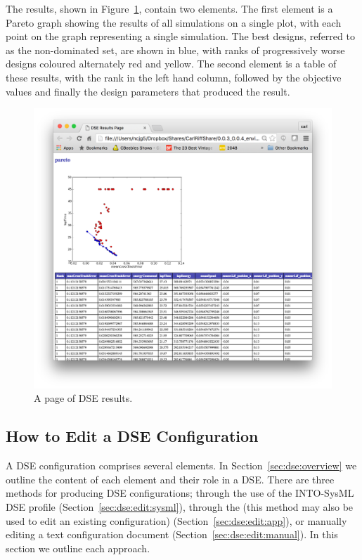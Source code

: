 The results, shown in Figure~\ref{fig:dse:results:page}, contain two elements.  The first element is a Pareto graph showing the results of all simulations on a single plot, with each point on the graph representing a single simulation.  The best designs, referred to as the non-dominated set, are shown in blue, with ranks of progressively worse designs coloured alternately red and yellow.  The second element is a table of these results, with the rank in the left hand column, followed by the objective values and finally the design parameters that produced the result.
%
%
%
\begin{figure}[ht]
	\centering
	\includegraphics[width=\textwidth]{figures/dse/results-page}
	\caption{A page of DSE results.}\label{fig:dse:results:page}
\end{figure}
%
%
%
\subsection{How to Edit a DSE Configuration}\label{sec:dse:edit}

A DSE configuration comprises several elements. In Section~\ref{sec:dse:overview} we outline the content of each element and their role in a DSE. 
There are three methods for producing DSE configurations; through the use of the INTO-SysML DSE profile (Section~\ref{sec:dse:edit:sysml}), through the \intoapp{} (this method may also be used to edit an existing configuration) (Section~\ref{sec:dse:edit:app}), or manually editing a text configuration document (Section~\ref{sec:dse:edit:manual}). In this section we outline each approach.  



